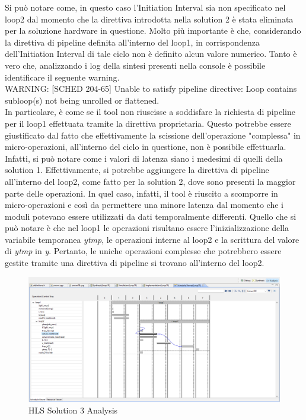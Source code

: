 Si può notare come, in questo caso l'Initiation Interval sia non specificato nel loop2 dal momento che la direttiva introdotta nella solution 2 è stata eliminata per la soluzione hardware in questione. Molto più importante è che, considerando la direttiva di pipeline definita all'interno del loop1, in corrispondenza dell'Initiation Interval di tale ciclo non è definito alcun valore numerico. Tanto è vero che, analizzando i log della sintesi presenti nella console è possibile identificare il seguente warning.
\\
WARNING: [SCHED 204-65] Unable to satisfy pipeline directive: Loop contains subloop(s) not being unrolled or flattened.
\\
In particolare, è come se il tool non riuscisse a soddisfare la richiesta di pipeline per il loop1 effettuata tramite la direttiva proprietaria. Questo potrebbe essere giustificato dal fatto che effettivamente la scissione dell'operazione "complessa" in micro-operazioni, all'interno del ciclo in questione, non è possibile effettuarla. Infatti, si può notare come i valori di latenza siano i medesimi di quelli della solution 1. Effettivamente, si potrebbe aggiungere la direttiva di pipeline all'interno del loop2, come fatto per la solution 2, dove sono presenti la maggior parte delle operazioni. In quel caso, infatti, il tool è riuscito a scomporre in micro-operazioni e così da permettere una minore latenza dal momento che i moduli potevano essere utilizzati da dati temporalmente differenti. Quello che si può notare è che nel loop1 le operazioni risultano essere l'inizializzazione della variabile temporanea \textit{ytmp}, le operazioni interne al loop2 e la scrittura del valore di \textit{ytmp} in \textit{y}. Pertanto, le uniche operazioni complesse che potrebbero essere gestite tramite una direttiva di pipeline si trovano all'interno del loop2.

\begin{figure}[H]
	\centering
	\includegraphics[width=1\textwidth]{solutions/s3/loop1pipeline.png}
	\caption{HLS Solution 3 Analysis}
\end{figure}

